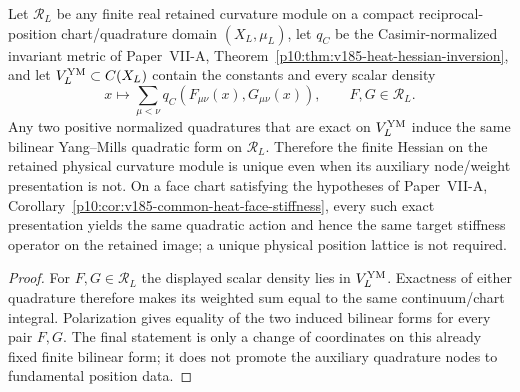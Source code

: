 \documentclass[12pt,a4paper]{article}
\begin{document}
\begin{corollary}
\label{p12:cor:v185-ym-quadrature-presentation-invariance}
Let $\mathscr R_L$ be any finite real retained curvature module on a compact
reciprocal-position chart/quadrature domain $(X_L,\mu_L)$, let $q_C$ be the
Casimir-normalized invariant metric of Paper~VII-A,
Theorem~\ref{p10:thm:v185-heat-hessian-inversion}, and let
$V_L^{\rm YM}\subset C(X_L)$ contain the constants and every scalar density
\[
 x\longmapsto
 \sum_{\mu<\nu}q_C(F_{\mu\nu}(x),G_{\mu\nu}(x)),
 \qquad F,G\in\mathscr R_L.
\]
Any two positive normalized quadratures that are exact on
$V_L^{\rm YM}$ induce the same bilinear Yang--Mills quadratic form on
$\mathscr R_L$.  Therefore the finite Hessian on the retained physical
curvature module is unique even when its auxiliary node/weight presentation
is not.  On a face chart satisfying the hypotheses of Paper~VII-A,
Corollary~\ref{p10:cor:v185-common-heat-face-stiffness}, every such exact
presentation yields the same quadratic action and hence the same target
stiffness operator on the retained image; a unique physical position lattice
is not required.
\end{corollary}
\begin{proof}
For $F,G\in\mathscr R_L$ the displayed scalar density lies in
$V_L^{\rm YM}$.  Exactness of either quadrature therefore makes its weighted
sum equal to the same continuum/chart integral.  Polarization gives equality of the two
induced bilinear forms for every pair $F,G$.  The final statement is only a
change of coordinates on this already fixed finite bilinear form; it does not
promote the auxiliary quadrature nodes to fundamental position data.
\end{proof}
\end{document}
